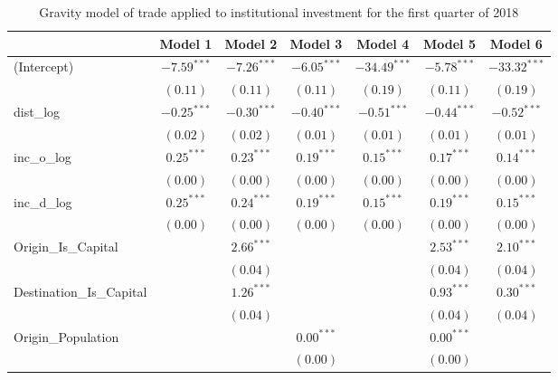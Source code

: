 \begin{table}
	\begin{center}
		\caption[Gravity Model of Trade for Q1 2018]{Gravity model of trade applied to institutional investment for the first quarter of 2018}
		\begin{tabular}{l c c c c c c }
			\hline
			& Model 1 & Model 2 & Model 3 & Model 4 & Model 5 & Model 6 \\
			\hline
			(Intercept)                  & $-7.59^{***}$ & $-7.26^{***}$ & $-6.05^{***}$ & $-34.49^{***}$ & $-5.78^{***}$ & $-33.32^{***}$ \\
			& $(0.11)$      & $(0.11)$      & $(0.11)$      & $(0.19)$       & $(0.11)$      & $(0.19)$       \\
			dist\_log                    & $-0.25^{***}$ & $-0.30^{***}$ & $-0.40^{***}$ & $-0.51^{***}$  & $-0.44^{***}$ & $-0.52^{***}$  \\
			& $(0.02)$      & $(0.02)$      & $(0.01)$      & $(0.01)$       & $(0.01)$      & $(0.01)$       \\
			inc\_o\_log                  & $0.25^{***}$  & $0.23^{***}$  & $0.19^{***}$  & $0.15^{***}$   & $0.17^{***}$  & $0.14^{***}$   \\
			& $(0.00)$      & $(0.00)$      & $(0.00)$      & $(0.00)$       & $(0.00)$      & $(0.00)$       \\
			inc\_d\_log                  & $0.25^{***}$  & $0.24^{***}$  & $0.19^{***}$  & $0.15^{***}$   & $0.19^{***}$  & $0.15^{***}$   \\
			& $(0.00)$      & $(0.00)$      & $(0.00)$      & $(0.00)$       & $(0.00)$      & $(0.00)$       \\
			Origin\_Is\_Capital          &               & $2.66^{***}$  &               &                & $2.53^{***}$  & $2.10^{***}$   \\
			&               & $(0.04)$      &               &                & $(0.04)$      & $(0.04)$       \\
			Destination\_Is\_Capital     &               & $1.26^{***}$  &               &                & $0.93^{***}$  & $0.30^{***}$   \\
			&               & $(0.04)$      &               &                & $(0.04)$      & $(0.04)$       \\
			Origin\_Population           &               &               & $0.00^{***}$  &                & $0.00^{***}$  &                \\
			&               &               & $(0.00)$      &                & $(0.00)$      &                \\

\end{tabular}
\end{center}
\end{table}
